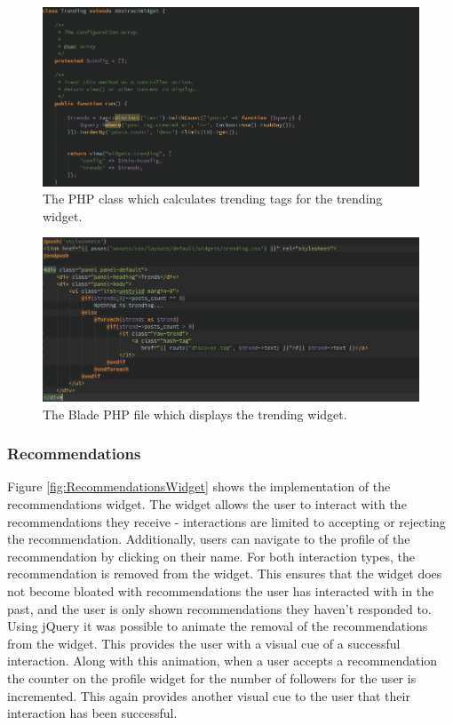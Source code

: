 \begin{figure}[H]
	\centering
	\includegraphics[width=\textwidth]{Images/Implementation/UI/Widgets/trending-class}
	\caption{The PHP class which calculates trending tags for the trending widget.}
	\label{fig:trending-class}
\end{figure}

\begin{figure}[H]
	\centering
	\includegraphics[width=\textwidth]{Images/Implementation/UI/Widgets/trending-blade}
	\caption{The Blade PHP file which displays the trending widget.}
	\label{fig:trending-blade}
\end{figure}

\subsubsection{Recommendations}
Figure \ref{fig:RecommendationsWidget} shows the implementation of the recommendations widget. The widget allows the user to interact with the recommendations they receive - interactions are limited to accepting or rejecting the recommendation. Additionally, users can navigate to the profile of the recommendation by clicking on their name. For both interaction types, the recommendation is removed from the widget. This ensures that the widget does not become bloated with recommendations the user has interacted with in the past, and the user is only shown recommendations they haven't responded to. Using jQuery it was possible to animate the removal of the recommendations from the widget. This provides the user with a visual cue of a successful interaction. Along with this animation, when a user accepts a recommendation the counter on the profile widget for the number of followers for the user is incremented. This again provides another visual cue to the user that their  interaction has been successful.

